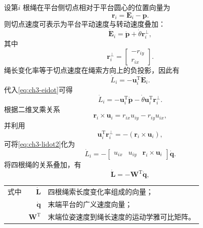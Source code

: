 设第$i$ 根绳在平台侧切点相对于平台圆心的位置向量为
\begin{equation}
  \bm r_i=\bm E_i-\bm p. \label{eq:ch3-ri}
\end{equation}
则切点速度可表示为平台平动速度与转动速度叠加：
\begin{equation}
  \dot{\bm E}_i=\dot{\bm p}+\dot{\theta}\bm r_i^\perp, \label{eq:ch3-eidot}
\end{equation}
其中
\begin{equation}
  \bm r_i^\perp=
  \begin{bmatrix}
    -r_{iy} \\ r_{ix}
  \end{bmatrix}.
\end{equation}
绳长变化率等于切点速度在绳索方向上的负投影，因此有
\begin{equation}
  \dot{L}_i=-\bm u_i^{\mathrm T}\dot{\bm E}_i. \label{eq:ch3-lidot1}
\end{equation}
代入\cref{eq:ch3-eidot}可得
\begin{equation}
  \dot{L}_i= -\bm u_i^{\mathrm T}\dot{\bm p} -\dot{\theta}\bm u_i^{\mathrm T}\bm r_i^\perp. \label{eq:ch3-lidot2}
\end{equation}
根据二维叉乘关系
\begin{equation}
  \bm r_i\times \bm u_i=r_{ix}u_{iy}-r_{iy}u_{ix}, \label{eq:ch3-cross2d}
\end{equation}
并利用
\begin{equation}
  \bm u_i^{\mathrm T}\bm r_i^\perp=-(\bm r_i\times \bm u_i), \label{eq:ch3-perp-cross}
\end{equation}
可将\cref{eq:ch3-lidot2}化为
\begin{equation}
  \dot{L}_i= - \begin{bmatrix} u_{ix} & u_{iy} & \bm r_i\times \bm u_i \end{bmatrix} \dot{\bm q}. \label{eq:ch3-lidot-final}
\end{equation}
将四根绳的关系叠加，有
\begin{equation}
  \dot{\bm L}=-\bm W^{\mathrm T}\dot{\bm q}, \label{eq:ch3-length-rate}
\end{equation}
\begin{tabularx}{\textwidth}{@{}l@{\quad}r@{———}X@{}}
  式中 & $\dot{\bm L}$ & 四根绳索长度变化率组成的向量；\\
       & $\dot{\bm q}$ & 末端平台的广义速度向量；\\
       & $\bm W^{\mathrm T}$ & 末端位姿速度到绳长速度的运动学雅可比矩阵。
\end{tabularx}
